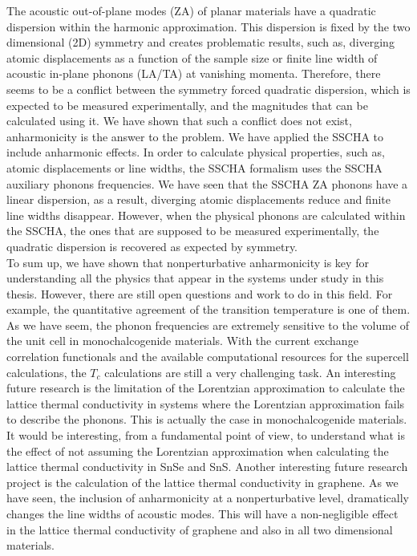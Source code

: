 The acoustic out-of-plane modes (ZA) of planar materials have a quadratic dispersion within the harmonic 
approximation. This dispersion is fixed by the two dimensional (2D) symmetry and creates problematic 
results, such as, diverging atomic displacements as a function of the sample size or finite line width of acoustic 
in-plane phonons (LA/TA) at vanishing momenta. Therefore, there seems to be a conflict between the symmetry forced 
quadratic dispersion, which is expected to be measured experimentally, and the magnitudes that can be calculated 
using it. We have shown that such a conflict does not exist, anharmonicity is the answer to the problem. We have 
applied the SSCHA to include anharmonic effects. In order to calculate physical properties, such as, atomic 
displacements or line widths, the SSCHA formalism uses the SSCHA auxiliary phonons frequencies. We have seen that 
the SSCHA ZA phonons have a linear dispersion, as a result, diverging atomic displacements reduce and finite line 
widths disappear. However, when the physical phonons are calculated within the SSCHA, the ones that are supposed to 
be measured experimentally, the quadratic dispersion is recovered as expected by symmetry. \\

To sum up, we have shown that nonperturbative anharmonicity is key for understanding all the physics that appear 
in the systems under study in this thesis. However, there are still open questions and work to do in this field. For 
example, the quantitative agreement of the transition temperature is one of them. As we have seem, the phonon 
frequencies are extremely sensitive to the volume of the unit cell in monochalcogenide materials. With the current 
exchange correlation functionals and the available computational resources for the supercell calculations, the 
$T_{c}$ calculations are still a very challenging task. An interesting future research is the limitation of the 
Lorentzian approximation to calculate the lattice thermal conductivity in systems where the Lorentzian approximation
fails to describe the phonons. This is actually the case in monochalcogenide materials. It would be interesting, from 
a fundamental point of view, to understand what is the effect of not assuming the Lorentzian approximation when 
calculating the lattice thermal conductivity in SnSe and SnS. Another interesting future research project is the 
calculation of the lattice thermal conductivity in graphene. As we have seen, the inclusion of anharmonicity at 
a nonperturbative level, dramatically changes the line widths of acoustic modes. This will have a non-negligible 
effect in the lattice thermal conductivity of graphene and also in all two dimensional materials.
